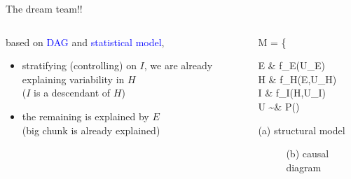%
%
\begin{frame}
	{The dream team!!}
	\begin{columns}
		\begin{column}{0.5\textwidth}
			based on \textcolor{blue}{DAG} and \textcolor{blue}{statistical model},
			\begin{itemize}
				\item stratifying (controlling) on $I$, we are already explaining variability in $H$ \\
				{\small ($I$ is a descendant of $H$)}
				\item the remaining is explained by $E$ \\
				{\small (big chunk is already explained)}
			\end{itemize}
		\end{column}
		\begin{column}{0.5\textwidth}  
			\begin{equ}
				M = \left\{ \begin{aligned} 
					E \leftarrow & \; f_{E}(U_{E}) \\
					H \leftarrow & \; f_{H}(E,U_{H}) \\
					I \leftarrow & \; f_{I}(H,U_{I}) \\
					U \sim & \; P()
				\end{aligned} \right
				\caption*{(a) structural model}
			\end{equ}
			\begin{figure}
				\caption*{(b) causal diagram}
			\end{figure}
		\end{column}
	\end{columns}
\end{frame}
